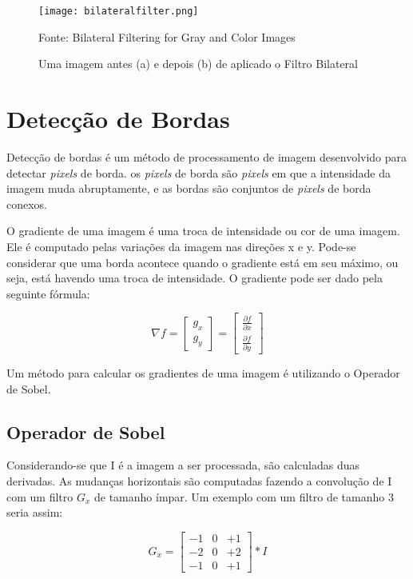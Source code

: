 \begin{figure}[H]
	\centering
	\texttt{[image: bilateralfilter.png]}
	\caption{Uma imagem antes (a) e depois (b) de aplicado o Filtro Bilateral}
Fonte: Bilateral Filtering for Gray and Color Images~\cite{tomasi1998bilateral}
	\label{fig:bilateral_filter_example}
\end{figure}

\section{Detecção de Bordas}
\label{sec:detecbordas}

Detecção de bordas é um método de processamento de imagem desenvolvido para detectar \emph{pixels} de borda. os \emph{pixels} de borda são \emph{pixels} em que a intensidade da imagem muda abruptamente, e as bordas são conjuntos de \emph{pixels} de borda conexos.\cite{gonzalez1977digital}

O gradiente de uma imagem é uma troca de intensidade ou cor de uma imagem. Ele é computado pelas variações da imagem nas direções x e y. Pode-se considerar que uma borda acontece quando o gradiente está em seu máximo, ou seja, está havendo uma troca de intensidade. O gradiente pode ser dado pela seguinte fórmula:

\begin{displaymath}
\nabla f={\begin{bmatrix}g_{x}\\g_{y}\end{bmatrix}}={\begin{bmatrix}{\frac {\partial f}{\partial x}}\\{\frac {\partial f}{\partial y}}\end{bmatrix}}
\end{displaymath}

Um método para calcular os gradientes de uma imagem é utilizando o Operador de Sobel.

\subsection{Operador de Sobel}
\label{sec:sobel}

Considerando-se que I é a imagem a ser processada, são calculadas duas derivadas. As mudanças horizontais são computadas fazendo a convolução de I com um filtro $G_{x}$ de tamanho ímpar. Um exemplo com um filtro de tamanho 3 seria assim:

\begin{displaymath}
G_{x} = \begin{bmatrix}
-1 & 0 & +1  \\
-2 & 0 & +2  \\
-1 & 0 & +1
\end{bmatrix} * I
\end{displaymath}

